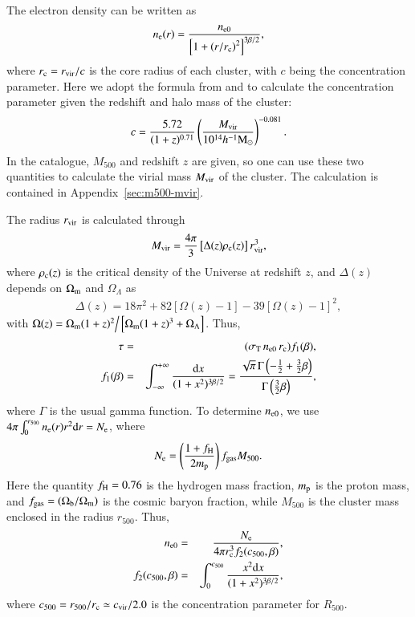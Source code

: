 \documentclass[traditabstract, longauth]{aa}
\newcommand{\1}{\'\i }
\def \der {{\rm d}}
\begin{document}
The electron density can be written as
\begin{eqnarray}
n_{\rm e}(r)=\frac{n_{\rm e0}}{\left[1+\left(r/r_{\rm c} \right)^{2}
 \right]^{3\beta /2}},
\end{eqnarray}
where $r_{\rm c}=r_{\rm vir}/c$ is the core radius of each cluster, with $c$
being the concentration parameter. Here we adopt the formula from \cite{Duffy08} and \cite{Komatsu11} to calculate the concentration parameter given the redshift and halo mass of the cluster:
\begin{eqnarray}
c=\frac{5.72}{(1+z)^{0.71}}\left(\frac{M_{\rm vir}}{10^{14}h^{-1}{\rm M}_{\odot}} \right)^{-0.081} \label{eq:c-para}.
\end{eqnarray}
In the catalogue, $M_{500}$ and redshift $z$ are given, so one can use these two quantities to calculate the virial mass $M_{\rm vir}$ of the cluster. The calculation is contained in Appendix~\ref{sec:m500-mvir}.

The radius $r_{\rm vir}$ is calculated through
\begin{eqnarray}
M_{\rm vir}=\frac{4 \pi}{3} \left[\Delta(z)\rho_{\rm c}(z) \right]r^{3}_{\rm vir}, \label{eq:M-vir}
\end{eqnarray}
where $\rho_{\rm c}(z)$ is the critical density of the Universe at redshift
$z$, and $\Delta(z)$ depends on $\Omega_{\rm m}$ and $\Omega_{\Lambda}$
as \citep{bryan1998}
\begin{eqnarray}
\Delta(z)=18\pi^{2} + 82[\Omega(z)-1] - 39[\Omega(z)-1]^{2}, \label{eq:Delta-z}
\end{eqnarray}
with $\Omega(z)=\Omega_{\rm m}(1+z)^2\Big/\left[\Omega_{\rm m}(1+z)^{3}+\Omega_{\Lambda} \right]$.
Thus,
\begin{eqnarray}
\tau &=& (\sigma_{\rm T}\,n_{\rm e0}\,r_{\rm c})f_{1}(\beta), \nonumber \\
f_{1}(\beta) &=& \int^{+\infty}_{-\infty}\frac{\der x}{(1+x^{2})^{3 \beta /2}}=\frac{\sqrt{\pi}\,\Gamma\left(-\frac{1}{2}+\frac{3}{2}\beta \right)}{\Gamma\left(\frac{3}{2}\beta \right)}, \label{eq:tau1}
\end{eqnarray}
where $\Gamma$ is the usual gamma function. To determine $n_{\rm e0}$,
we use $4\pi \int^{r_{500}}_{0} n_{\rm e}(r) r^{2} \der r=N_{\rm e}$, where
\begin{eqnarray}
N_{\rm e}=\left(\frac{1+f_{\rm H}}{2 m_{\rm p}} \right) f_{\rm gas}M_{500}. \label{eq:Ne}
\end{eqnarray}
Here the quantity $f_{\rm H}=0.76$ is the hydrogen mass fraction,
$m_{\rm p}$ is the
proton mass, and $f_{\rm gas}=(\Omega_{\rm b}/\Omega_{\rm m})$ is the cosmic
baryon fraction, while $M_{500}$ is the cluster mass enclosed in the radius
$r_{500}$. Thus,
\begin{eqnarray}
n_{\rm e0} &=& \frac{N_{\rm e}}{4\pi r^{3}_{\rm c}f_{2}(c_{500},\beta)} \nonumber, \\
 f_{2}(c_{500},\beta) &=& \int^{c_{500}}_{0}\frac{x^{2} \der x}{(1+x^{2})^{3 \beta /2}}, \label{eq:ne0}
\end{eqnarray}
where $c_{500}=r_{500}/r_{\rm c} \simeq c_{\rm vir}/2.0$ is the concentration
parameter for $R_{500}$.
\end{document}
